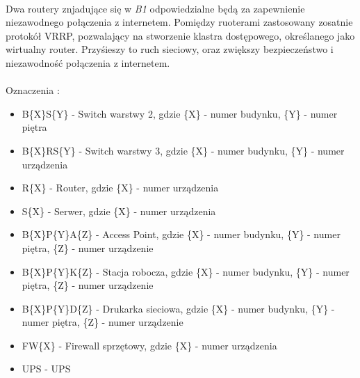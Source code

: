 \paragraph{}
Dwa routery znjadujące się w \textit{B1} odpowiedzialne będą za zapewnienie niezawodnego połączenia z internetem. Pomiędzy ruoterami zastosowany zosatnie protokół VRRP, pozwalający na stworzenie klastra dostępowego, określanego jako wirtualny router. Przyśieszy to ruch sieciowy, oraz zwiększy bezpieczeństwo i niezawodność połączenia z internetem.

\newpage
\paragraph{}
Oznaczenia :
\begin{itemize}
	\item B\{X\}S\{Y\} - Switch warstwy 2, gdzie \{X\} - numer budynku, \{Y\} - numer piętra
	\item B\{X\}RS\{Y\} - Switch warstwy 3, gdzie \{X\} - numer budynku, \{Y\} - numer urządzenia
	\item R\{X\} - Router, gdzie \{X\} - numer urządzenia
	\item S\{X\} - Serwer, gdzie \{X\} - numer urządzenia
	\item B\{X\}P\{Y\}A\{Z\} - Access Point, gdzie \{X\} - numer budynku, \{Y\} - numer piętra, \{Z\} - numer urządzenie
	\item B\{X\}P\{Y\}K\{Z\} - Stacja robocza, gdzie \{X\} - numer budynku, \{Y\} - numer piętra, \{Z\} - numer urządzenie
	\item B\{X\}P\{Y\}D\{Z\} - Drukarka sieciowa, gdzie \{X\} - numer budynku, \{Y\} - numer piętra, \{Z\} - numer urządzenie
	\item FW\{X\} - Firewall sprzętowy, gdzie \{X\} - numer urządzenia
	\item UPS - UPS
\end{itemize}

